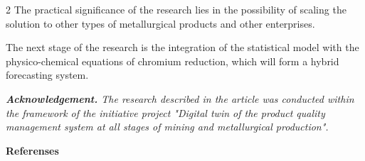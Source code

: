 \begin{multicols}{2}
The practical significance of the research lies in the possibility of
scaling the solution to other types of metallurgical products and other
enterprises.

The next stage of the research is the integration of the statistical
model with the physico-chemical equations of chromium reduction, which
will form a hybrid forecasting system.

\emph{{\bfseries Acknowledgement.} The research described in the article
was conducted within the framework of the initiative project "Digital
twin of the product quality management system at all stages of mining
and metallurgical production".}
\end{multicols}

\begin{center}
{\bfseries Referenses}
\end{center}

